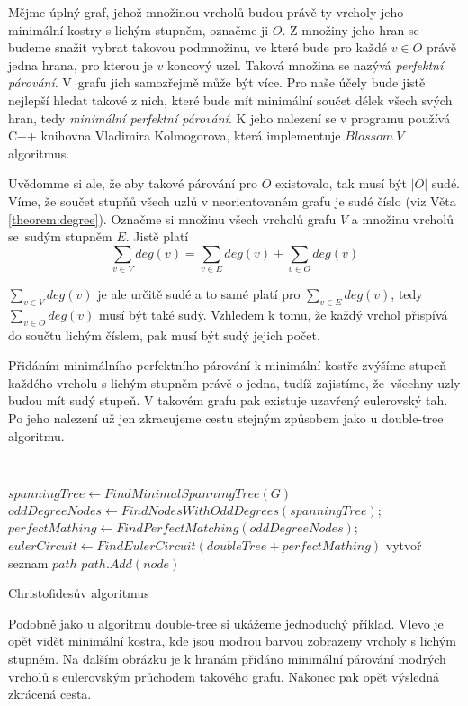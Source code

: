\documentclass[
  printversion=false,
  joinlists=true,
  glossaries=true,
  figures=true,
  tables=true,
  sourcecodes=false,
  theorems=false,
  bibencoding=utf8,
  language=czech,
  encoding=utf8,
  program=infpvs,
  index=true,
  biblatex=true
]{kidiplom}
\begin{document}
Mějme úplný graf, jehož množinou vrcholů budou právě ty vrcholy jeho minimální kostry s lichým stupněm, označme ji $O$. Z množiny jeho hran se budeme snažit vybrat takovou podmnožinu, ve které bude pro každé $v \in O$ právě jedna hrana, pro kterou je $v$ koncový uzel. Taková množina se nazývá \textit{perfektní párování}. V~grafu jich samozřejmě může být více. Pro naše účely bude jistě nejlepší hledat takové z nich, které bude mít minimální součet délek všech svých hran, tedy \textit{minimální perfektní párování}. K jeho nalezení se v programu používá C++ knihovna Vladimira Kolmogorova, která implementuje $Blossom~V$ algoritmus.

Uvědomme si ale, že aby takové párování pro $O$ existovalo, tak musí být $|O|$ sudé. Víme, že součet stupňů všech uzlů v neorientovaném grafu je sudé číslo (viz Věta \ref{theorem:degree}). Označme si množinu všech vrcholů grafu $V$ a množinu vrcholů se~sudým stupněm $E$. Jistě platí
$$
\sum_{v \in V} deg(v) = \sum_{v \in E} deg(v) + \sum_{v \in O} deg(v)
$$

$\sum_{v \in V} deg(v)$ je ale určitě sudé a to samé platí pro $\sum_{v \in E}deg(v)$, tedy $\sum_{v \in O} deg(v)$ musí být také sudý. Vzhledem k tomu, že každý vrchol přispívá do součtu lichým číslem, pak musí být sudý jejich počet.

Přidáním minimálního perfektního párování k minimální kostře zvýšíme stupeň každého vrcholu s lichým stupněm právě o jedna, tudíž zajistíme, že~všechny uzly budou mít sudý stupeň. V takovém grafu pak existuje uzavřený eulerovský tah. Po jeho nalezení už jen zkracujeme cestu stejným způsobem jako u double-tree algoritmu.\leavevmode\newline

{\SetAlgoNoLine\
\begin{algorithm}[H]
$spanningTree \leftarrow FindMinimalSpanningTree(G)$\;
$oddDegreeNodes \leftarrow FindNodesWithOddDegrees(spanningTree)$;
$perfectMathing \leftarrow FindPerfectMatching(oddDegreeNodes)$;
$eulerCircuit \leftarrow FindEulerCircuit(doubleTree + perfectMathing)$\;
vytvoř seznam $path$\;
{
	{
		$path.Add(node)$\;
	}
}
\caption{Christofidesův algoritmus}
\end{algorithm}}\leavevmode\newline

Podobně jako u algoritmu double-tree si ukážeme jednoduchý příklad. Vlevo je opět vidět minimální kostra, kde jsou modrou barvou zobrazeny vrcholy s lichým stupněm. Na dalším obrázku je k hranám přidáno minimální párování modrých vrcholů s eulerovským průchodem takového grafu. Nakonec pak opět výsledná zkrácená cesta.
\end{document}
